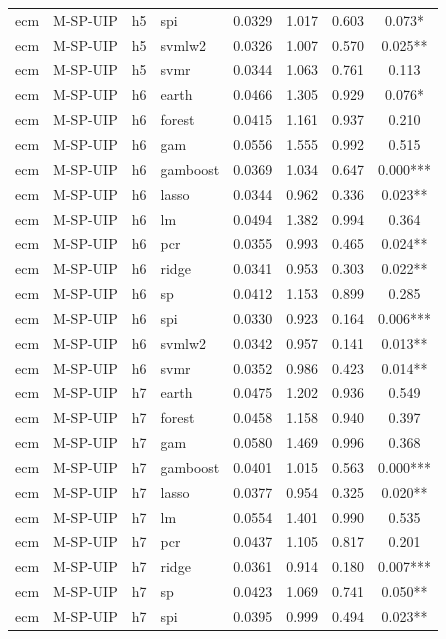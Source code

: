 \begin{ThreePartTable}
\begin{longtable}[t]{llclcccc}
ecm & M-SP-UIP & h5 & spi & 0.0329 & 1.017 & 0.603 & 0.073*\\
ecm & M-SP-UIP & h5 & svmlw2 & 0.0326 & 1.007 & 0.570 & 0.025**\\
ecm & M-SP-UIP & h5 & svmr & 0.0344 & 1.063 & 0.761 & 0.113\\
\addlinespace
ecm & M-SP-UIP & h6 & earth & 0.0466 & 1.305 & 0.929 & 0.076*\\
ecm & M-SP-UIP & h6 & forest & 0.0415 & 1.161 & 0.937 & 0.210\\
ecm & M-SP-UIP & h6 & gam & 0.0556 & 1.555 & 0.992 & 0.515\\
ecm & M-SP-UIP & h6 & gamboost & 0.0369 & 1.034 & 0.647 & 0.000***\\
ecm & M-SP-UIP & h6 & lasso & 0.0344 & 0.962 & 0.336 & 0.023**\\
ecm & M-SP-UIP & h6 & lm & 0.0494 & 1.382 & 0.994 & 0.364\\
ecm & M-SP-UIP & h6 & pcr & 0.0355 & 0.993 & 0.465 & 0.024**\\
ecm & M-SP-UIP & h6 & ridge & 0.0341 & 0.953 & 0.303 & 0.022**\\
ecm & M-SP-UIP & h6 & sp & 0.0412 & 1.153 & 0.899 & 0.285\\
ecm & M-SP-UIP & h6 & spi & 0.0330 & 0.923 & 0.164 & 0.006***\\
ecm & M-SP-UIP & h6 & svmlw2 & 0.0342 & 0.957 & 0.141 & 0.013**\\
ecm & M-SP-UIP & h6 & svmr & 0.0352 & 0.986 & 0.423 & 0.014**\\
\addlinespace
ecm & M-SP-UIP & h7 & earth & 0.0475 & 1.202 & 0.936 & 0.549\\
ecm & M-SP-UIP & h7 & forest & 0.0458 & 1.158 & 0.940 & 0.397\\
ecm & M-SP-UIP & h7 & gam & 0.0580 & 1.469 & 0.996 & 0.368\\
ecm & M-SP-UIP & h7 & gamboost & 0.0401 & 1.015 & 0.563 & 0.000***\\
ecm & M-SP-UIP & h7 & lasso & 0.0377 & 0.954 & 0.325 & 0.020**\\
ecm & M-SP-UIP & h7 & lm & 0.0554 & 1.401 & 0.990 & 0.535\\
ecm & M-SP-UIP & h7 & pcr & 0.0437 & 1.105 & 0.817 & 0.201\\
ecm & M-SP-UIP & h7 & ridge & 0.0361 & 0.914 & 0.180 & 0.007***\\
ecm & M-SP-UIP & h7 & sp & 0.0423 & 1.069 & 0.741 & 0.050**\\
ecm & M-SP-UIP & h7 & spi & 0.0395 & 0.999 & 0.494 & 0.023**\\

\end{longtable}
\end{ThreePartTable}
